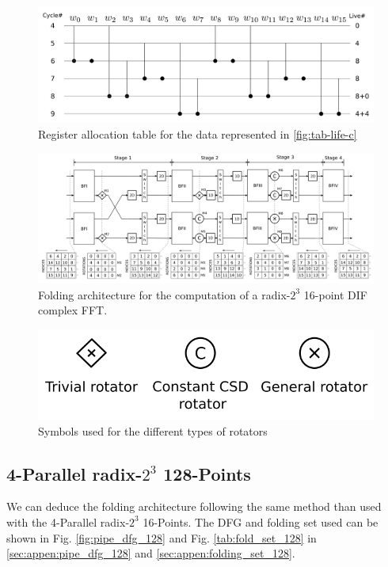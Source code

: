 \documentclass[a4paper, 10pt, conference]{ieeeconf}
\begin{document}
\begin{figure}[ht!]
\centering
 \includegraphics[width=1\linewidth]{Diagramas/life_chart_c.png}%
\caption{Register allocation table for the data represented in \ref{fig:tab-life-c}}
\label{fig:tab-aloc-c}
\end{figure}

\begin{figure}[ht!]
\centering
 \includegraphics[width=0.85\linewidth]{Diagramas/folding-16.png}%
\caption{Folding architecture for the computation of a radix-$2^3$ 16-point DIF complex FFT.}
\label{fig:circ-folding-16}
\end{figure}

\begin{figure}[ht!]
\centering
 \includegraphics[width=0.85\linewidth]{Diagramas/rotators.png}%
\caption{Symbols used for the different types of rotators}
\label{fig:rotators}
\end{figure}

\subsection{4-Parallel radix-$2^3$ 128-Points}

We can deduce the folding architecture following the same method than used with the 4-Parallel radix-$2^3$ 16-Points. The DFG and folding set used can be shown in Fig. \ref{fig:pipe_dfg_128} and Fig. \ref{tab:fold_set_128} in \ref{sec:appen:pipe_dfg_128} and \ref{sec:appen:folding_set_128}.
\end{document}
